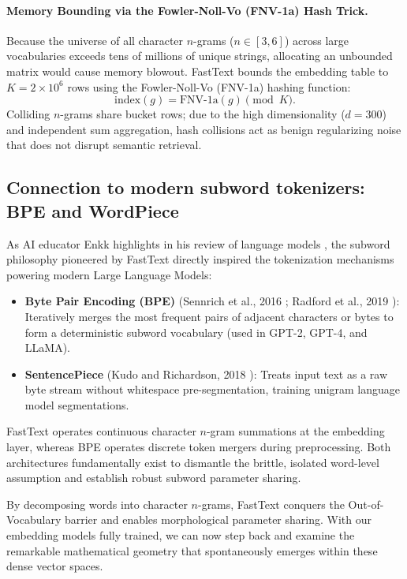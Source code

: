 \documentclass[../../main.tex]{subfiles}
\begin{document}
\paragraph{Memory Bounding via the Fowler-Noll-Vo (FNV-1a) Hash Trick.}
Because the universe of all character $n$-grams ($n \in [3, 6]$) across large vocabularies exceeds tens of millions of unique strings, allocating an unbounded matrix would cause memory blowout. FastText bounds the embedding table to $K = 2 \times 10^6$ rows using the Fowler-Noll-Vo (FNV-1a) hashing function:
\begin{equation}
\label{eq:fnv_hash}
\text{index}(g) = \text{FNV-1a}(g) \pmod K.
\end{equation}
Colliding $n$-grams share bucket rows; due to the high dimensionality ($d = 300$) and independent sum aggregation, hash collisions act as benign regularizing noise that does not disrupt semantic retrieval.

\subsection{Connection to modern subword tokenizers: BPE and WordPiece}
\label{subsec:subword_tokenizers_link}

As AI educator Enkk highlights in his review of language models \cite{enkk2023embeddings}, the subword philosophy pioneered by FastText directly inspired the tokenization mechanisms powering modern Large Language Models:
\begin{itemize}
    \item \textbf{Byte Pair Encoding (BPE)} (Sennrich et al., 2016 \cite{sennrich2016}; Radford et al., 2019 \cite{radford2019}): Iteratively merges the most frequent pairs of adjacent characters or bytes to form a deterministic subword vocabulary (used in GPT-2, GPT-4, and LLaMA).
    \item \textbf{SentencePiece} (Kudo and Richardson, 2018 \cite{kudo2018}): Treats input text as a raw byte stream without whitespace pre-segmentation, training unigram language model segmentations.
\end{itemize}
FastText operates continuous character $n$-gram summations at the embedding layer, whereas BPE operates discrete token mergers during preprocessing. Both architectures fundamentally exist to dismantle the brittle, isolated word-level assumption and establish robust subword parameter sharing.

By decomposing words into character $n$-grams, FastText conquers the Out-of-Vocabulary barrier and enables morphological parameter sharing. With our embedding models fully trained, we can now step back and examine the remarkable mathematical geometry that spontaneously emerges within these dense vector spaces.
\end{document}
